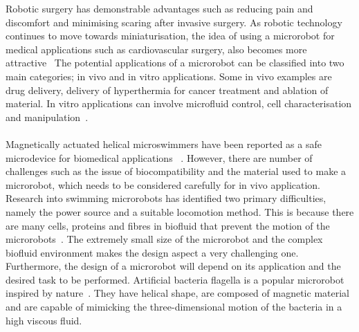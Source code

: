 \documentclass[12pt,a4paper,titlepage]{report}
\begin{document}
Robotic surgery has demonstrable advantages such as reducing pain and discomfort and 
minimising scaring after invasive surgery. As robotic technology continues to move towards miniaturisation, the idea of using
a microrobot for medical applications such as cardiovascular  surgery, also becomes more attractive~\citep{phil2013robotics}
The potential applications of a microrobot can be classified into two main categories; in vivo and in vitro applications.
Some in vivo examples are drug delivery, delivery of hyperthermia for cancer treatment and ablation of material.
In vitro applications can involve microfluid control, cell characterisation and manipulation~\citep{edd2003biomimetic}.  


\paragraph{}

Magnetically actuated helical microswimmers have been reported as a safe microdevice for biomedical applications
~\citep{peyer2013magnetic}. However, there are number of challenges such as the issue of biocompatibility and the material 
used to make a microrobot, which needs to be considered carefully for in vivo application\citep{qiu2014noncytotoxic}.
Research into swimming microrobots has identified two primary difficulties, namely the power source and a suitable locomotion method.
This is because
there are many cells, proteins and fibres in biofluid that prevent the motion of the microrobots~\citep{peyer2013bio}. 
The extremely small size of the microrobot and the
complex biofluid environment makes the design aspect a very challenging one.   
Furthermore, the design of a microrobot will depend on its application and the desired task to be performed.
Artificial bacteria flagella is a popular microrobot inspired by nature~\citep{qiu2014noncytotoxic}. 
They have helical shape, are composed of magnetic material and are capable of mimicking the three-dimensional 
motion of the bacteria in a high viscous fluid.

 
\end{document}
